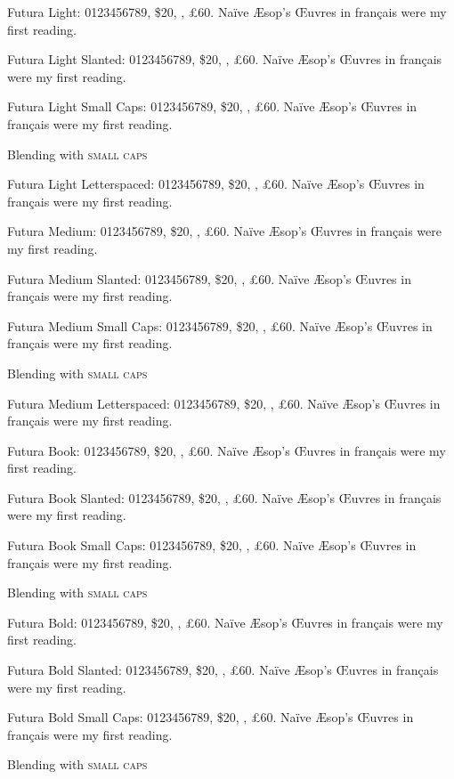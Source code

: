 \documentclass{minimal}
\begin{document}
{\selectfont
Futura  Light:  0123456789, \$20, , \pounds60.
Na\"ive \AE sop's \OE uvres in fran\c cais were my first reading.
\lipsum[41]

{\selectfont
Futura  Light Slanted:  0123456789, \$20, , \pounds60.
Na\"ive \AE sop's \OE uvres in fran\c cais were my first reading.
\lipsum[42]}

{\selectfont
Futura  Light Small Caps:  0123456789, \$20, , \pounds60.
Na\"ive \AE sop's \OE uvres in fran\c cais were my first reading.
\lipsum[43]}

Blending with \textsc{small caps}}

{\selectfont
Futura Light Letterspaced:  0123456789, \$20, , \pounds60.
Na\"ive \AE sop's \OE uvres in fran\c cais were my first reading.
\lipsum[44]}


{\selectfont
Futura  Medium:  0123456789, \$20, , \pounds60.
Na\"ive \AE sop's \OE uvres in fran\c cais were my first reading.
\lipsum[51]

{\selectfont
Futura  Medium Slanted:  0123456789, \$20, , \pounds60.
Na\"ive \AE sop's \OE uvres in fran\c cais were my first reading.
\lipsum[52]}

{\selectfont
Futura  Medium Small Caps:  0123456789, \$20, , \pounds60.
Na\"ive \AE sop's \OE uvres in fran\c cais were my first reading.
\lipsum[53]}

Blending with \textsc{small caps}}

{\selectfont
Futura Medium Letterspaced:  0123456789, \$20, , \pounds60.
Na\"ive \AE sop's \OE uvres in fran\c cais were my first reading.
\lipsum[54]}


{\selectfont
Futura  Book:  0123456789, \$20, , \pounds60.
Na\"ive \AE sop's \OE uvres in fran\c cais were my first reading.
\lipsum[61]

{\selectfont
Futura  Book Slanted:  0123456789, \$20, , \pounds60.
Na\"ive \AE sop's \OE uvres in fran\c cais were my first reading.
\lipsum[62]}

{\selectfont
Futura  Book Small Caps:  0123456789, \$20, , \pounds60.
Na\"ive \AE sop's \OE uvres in fran\c cais were my first reading.
\lipsum[63]}

Blending with \textsc{small caps}}

{\selectfont
Futura  Bold:  0123456789, \$20, , \pounds60.
Na\"ive \AE sop's \OE uvres in fran\c cais were my first reading.
\lipsum[71]

{\selectfont
Futura  Bold Slanted:  0123456789, \$20, , \pounds60.
Na\"ive \AE sop's \OE uvres in fran\c cais were my first reading.
\lipsum[72]}

{\selectfont
Futura  Bold Small Caps:  0123456789, \$20, , \pounds60.
Na\"ive \AE sop's \OE uvres in fran\c cais were my first reading.
\lipsum[73]}

Blending with \textsc{small caps}}
\end{document}
